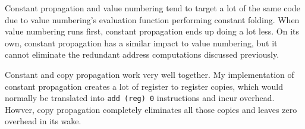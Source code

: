 \documentclass{article}
\begin{document}
Constant propagation and value numbering tend to target a lot of the same code due to
value numbering's evaluation function performing constant folding.
When value numbering runs first, constant propagation ends up doing a lot less.
On its own, constant propagation has a similar impact to value numbering, but it cannot eliminate
the redundant address computations discussed previously.

Constant and copy propagation work very well together.
My implementation of constant propagation creates a lot of register to register copies,
which would normally be translated into \texttt{add (reg) 0} instructions and incur overhead.
Howver, copy propagation completely eliminates all those copies and leaves zero overhead in its wake.
\end{document}
